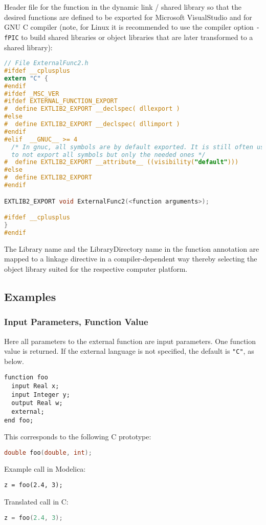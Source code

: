 \begin{example}
Header file for the function in the dynamic link / shared library
 so that the desired functions are defined to be exported
for Microsoft VisualStudio and for GNU C compiler (note, for Linux it is
recommended to use the compiler option \lstinline!-fPIC! to build shared
libraries or object libraries that are later transformed to a shared
library):
\begin{lstlisting}[language=C]
// File ExternalFunc2.h
#ifdef __cplusplus
extern "C" {
#endif
#ifdef _MSC_VER
#ifdef EXTERNAL_FUNCTION_EXPORT
#  define EXTLIB2_EXPORT __declspec( dllexport )
#else
#  define EXTLIB2_EXPORT __declspec( dllimport )
#endif
#elif  __GNUC__ >= 4
  /* In gnuc, all symbols are by default exported. It is still often useful,
  to not export all symbols but only the needed ones */
#  define EXTLIB2_EXPORT __attribute__ ((visibility("default")))
#else
#  define EXTLIB2_EXPORT
#endif

EXTLIB2_EXPORT void ExternalFunc2(<function arguments>);

#ifdef __cplusplus
}
#endif
\end{lstlisting}
\end{example}

The Library name and the LibraryDirectory name in the function
annotation are mapped to a linkage directive in a compiler-dependent way
thereby selecting the object library suited for the respective computer
platform.

\subsection{Examples}\label{examples1}

\subsubsection{Input Parameters, Function Value}\label{input-parameters-function-value}

\begin{example}
Here all parameters to the external function are input
parameters. One function value is returned. If the external language is
not specified, the default is \lstinline!"C"!, as below.
\begin{lstlisting}[language=modelica]
function foo
  input Real x;
  input Integer y;
  output Real w;
  external;
end foo;
\end{lstlisting}
This corresponds to the following C prototype:
\begin{lstlisting}[language=C]
double foo(double, int);
\end{lstlisting}

Example call in Modelica:
\begin{lstlisting}[language=modelica]
z = foo(2.4, 3);
\end{lstlisting}
Translated call in C:
\begin{lstlisting}[language=C]
z = foo(2.4, 3);
\end{lstlisting}
\end{example}

